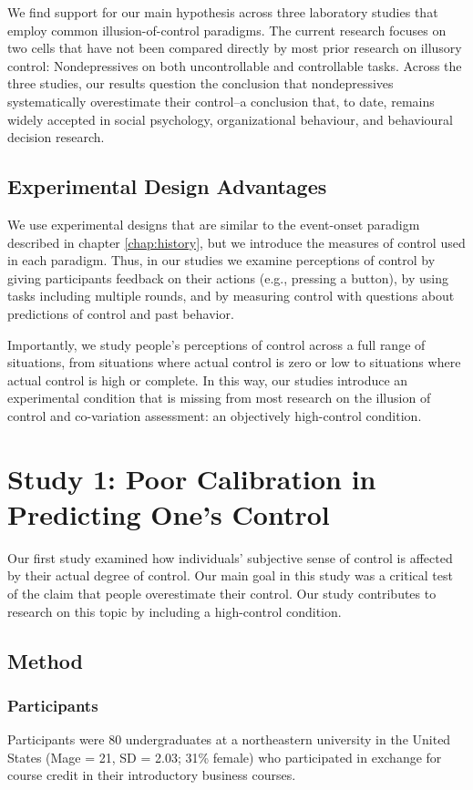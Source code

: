 \documentclass[USenglish,letterpaper,12pt,extrafontsizes,oneside,onecolumn,final]{memoir}
\begin{document}
We find support for our main hypothesis across three laboratory studies that employ common illusion-of-control paradigms. The current research focuses on two cells that have not been compared directly by most prior research on illusory control: Nondepressives on both uncontrollable and controllable tasks. Across the three studies, our results question the conclusion that nondepressives systematically overestimate their control--a conclusion that, to date, remains widely accepted in social psychology, organizational behaviour, and behavioural decision research.

\subsection{Experimental Design Advantages}
We use experimental designs that are similar to the event-onset paradigm described in chapter \ref{chap:history}, but we introduce the measures of control used in each paradigm. Thus, in our studies we examine perceptions of control by giving participants feedback on their actions (e.g., pressing a button), by using tasks including multiple rounds, and by measuring control with questions about predictions of control and past behavior. 

Importantly, we study people's perceptions of control across a full range of situations, from situations where actual control is zero or low to situations where actual control is high or complete. In this way, our studies introduce an experimental condition that is missing from most research on the illusion of control and co-variation assessment: an objectively high-control condition.

\section{Study 1: Poor Calibration in Predicting One's Control}
Our first study examined how individuals' subjective sense of control is affected by their actual degree of control. Our main goal in this study was a critical test of the claim that people overestimate their control. Our study contributes to research on this topic by including a high-control condition.

\subsection{Method}
\subsubsection{Participants}
Participants were 80 undergraduates at a northeastern university in the United States (Mage = 21, SD = 2.03; 31\% female) who participated in exchange for course credit in their introductory business courses. 
\end{document}
